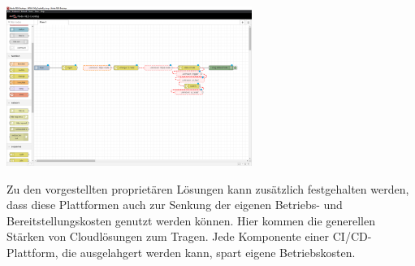 \begin{center}
    \includegraphics[width=0.6\textwidth]{Grafiken/NodeRed_Flow.png}
    \label{Grafik:Beispielhafter Flow in der NodeRed-Desktopversion}
\end{center}
Zu den vorgestellten proprietären Lösungen kann zusätzlich festgehalten werden, dass diese Plattformen auch zur Senkung der eigenen Betriebs- und Bereitstellungskosten genutzt werden können. Hier kommen die generellen Stärken von Cloudlösungen zum Tragen. Jede Komponente einer \acrshort{CI}/\acrshort{CD}-Plattform, die ausgelahgert werden kann, spart eigene Betriebskosten.